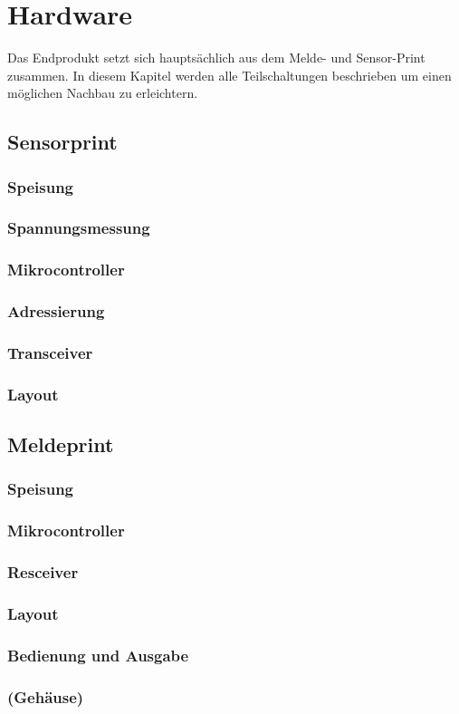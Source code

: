 \section{Hardware}
Das Endprodukt setzt sich hauptsächlich aus dem Melde- und Sensor-Print zusammen. In diesem
Kapitel werden alle Teilschaltungen beschrieben um einen möglichen Nachbau zu erleichtern.
\subsection{Sensorprint}
\subsubsection{Speisung}
\subsubsection{Spannungsmessung}
\subsubsection{Mikrocontroller}
\subsubsection{Adressierung}
\subsubsection{Transceiver}
\subsubsection{Layout}
\subsection{Meldeprint}
\subsubsection{Speisung}
\subsubsection{Mikrocontroller}
\subsubsection{Resceiver}
\subsubsection{Layout}
\subsubsection{Bedienung und Ausgabe}
\subsubsection{(Gehäuse)}